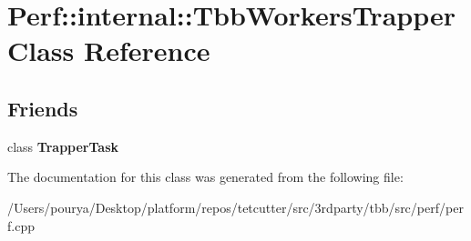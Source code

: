 \hypertarget{classPerf_1_1internal_1_1TbbWorkersTrapper}{}\section{Perf\+:\+:internal\+:\+:Tbb\+Workers\+Trapper Class Reference}
\label{classPerf_1_1internal_1_1TbbWorkersTrapper}
\subsection*{Friends}
\begin{DoxyCompactItemize}
\item 
\hypertarget{classPerf_1_1internal_1_1TbbWorkersTrapper_a075df74796930e0e0f90fcb8e022d8ac}{}class {\bfseries Trapper\+Task}\label{classPerf_1_1internal_1_1TbbWorkersTrapper_a075df74796930e0e0f90fcb8e022d8ac}

\end{DoxyCompactItemize}


The documentation for this class was generated from the following file\+:\begin{DoxyCompactItemize}
\item 
/\+Users/pourya/\+Desktop/platform/repos/tetcutter/src/3rdparty/tbb/src/perf/perf.\+cpp\end{DoxyCompactItemize}
